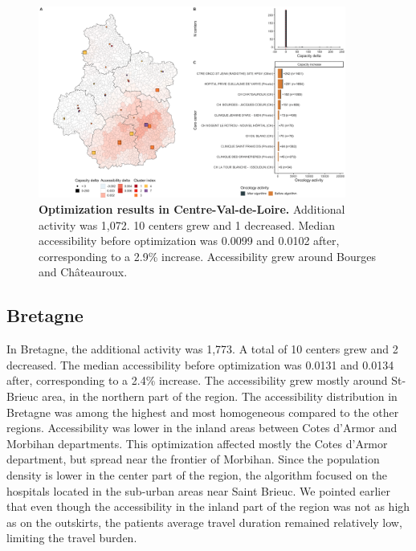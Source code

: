 \begin{figure}[H]
    \includegraphics[width=0.9\textwidth]{images/camion/optim_region/optim_Centre-Val-de-Loire.png}
    \centering
    \caption{ \textbf{Optimization results in Centre-Val-de-Loire.} Additional
        activity was 1,072. 10 centers grew and 1 decreased. Median
        accessibility before optimization was 0.0099 and 0.0102 after,
        corresponding to a 2.9\% increase. Accessibility grew around
        Bourges and Châteauroux. }
\end{figure}

\subsection*{Bretagne}

In Bretagne, the additional activity was 1,773. A total of 10 centers grew and
2 decreased. The median accessibility before optimization was 0.0131 and 0.0134 after,
corresponding to a 2.4\% increase. The accessibility grew mostly around St-Brieuc area,
in the northern part of the region. The accessibility distribution in Bretagne
was among the highest and most homogeneous compared to the other regions.
Accessibility was lower in the inland areas between Cotes d'Armor and Morbihan
departments. This optimization affected mostly the Cotes d'Armor department, but
spread near the frontier of Morbihan. Since the population density is lower in
the center part of the region, the algorithm focused on the hospitals located
in the sub-urban areas near Saint Brieuc. We pointed earlier that even though
the accessibility in the inland part of the region was not as high as on the
outskirts, the patients average travel duration remained relatively low,
limiting the travel burden.

